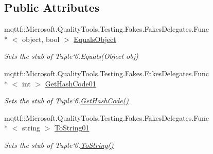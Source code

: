 \subsection*{Public Attributes}
\begin{DoxyCompactItemize}
\item 
mqttf\-::\-Microsoft.\-Quality\-Tools.\-Testing.\-Fakes.\-Fakes\-Delegates.\-Func\\*
$<$ object, bool $>$ \hyperlink{class_system_1_1_fakes_1_1_stub_tuple_3_01_t1_00_01_t2_00_01_t3_00_01_t4_00_01_t5_00_01_t6_01_4_a16a8dd17a162e1a7843e7ce37c54bb66}{Equals\-Object}
\begin{DoxyCompactList}\small\item\em Sets the stub of Tuple`6.Equals(\-Object obj)\end{DoxyCompactList}\item 
mqttf\-::\-Microsoft.\-Quality\-Tools.\-Testing.\-Fakes.\-Fakes\-Delegates.\-Func\\*
$<$ int $>$ \hyperlink{class_system_1_1_fakes_1_1_stub_tuple_3_01_t1_00_01_t2_00_01_t3_00_01_t4_00_01_t5_00_01_t6_01_4_a87205f00165713f2f9dc9bda7e891e5f}{Get\-Hash\-Code01}
\begin{DoxyCompactList}\small\item\em Sets the stub of Tuple`6.\hyperlink{class_system_1_1_fakes_1_1_stub_tuple_3_01_t1_00_01_t2_00_01_t3_00_01_t4_00_01_t5_00_01_t6_01_4_a90ab03c90d73a050914af7006ecb88e3}{Get\-Hash\-Code()}\end{DoxyCompactList}\item 
mqttf\-::\-Microsoft.\-Quality\-Tools.\-Testing.\-Fakes.\-Fakes\-Delegates.\-Func\\*
$<$ string $>$ \hyperlink{class_system_1_1_fakes_1_1_stub_tuple_3_01_t1_00_01_t2_00_01_t3_00_01_t4_00_01_t5_00_01_t6_01_4_ab5574a29256c69cdff893bedd424f1b6}{To\-String01}
\begin{DoxyCompactList}\small\item\em Sets the stub of Tuple`6.\hyperlink{class_system_1_1_fakes_1_1_stub_tuple_3_01_t1_00_01_t2_00_01_t3_00_01_t4_00_01_t5_00_01_t6_01_4_a2be9c97e4cec3162c563bc878932fff0}{To\-String()}\end{DoxyCompactList}\end{DoxyCompactItemize}
